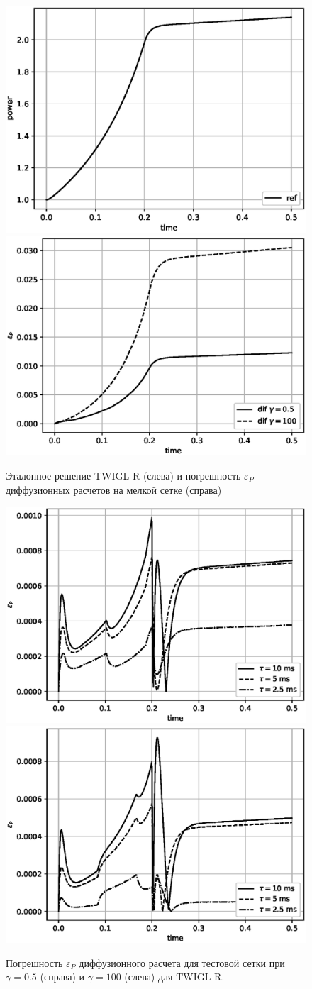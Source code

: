 \documentclass{crm-article}
\begin{document}
\begin{figure}[ht]
\begin{center}
	\includegraphics[width=0.4\linewidth]{sp3_ref_r.eps}\hspace{20pt}
	\includegraphics[width=0.4\linewidth]{odds_r.eps}\\
	\caption{\label{image:canonsummary} Эталонное решение TWIGL-R (слева) и погрешность $\varepsilon_P$ диффузионных расчетов на мелкой сетке (справа)}
	\label{ris:sp3_ref_r}
\end{center}
\end{figure}

\begin{figure}[ht]
\begin{center}
	\includegraphics[width=0.4\linewidth]{dif_tau_r.eps}\hspace{20pt}
	\includegraphics[width=0.4\linewidth]{dif_tau_r_100.eps}\\
	\caption{\label{image:canonsummary} Погрешность $\varepsilon_P$ диффузионного расчета для тестовой сетки при $\gamma=0.5$ (справа) и $\gamma=100$ (слева) для TWIGL-R.}
	\label{ris:dif_tau_r}
\end{center}
\end{figure}
\end{document}
